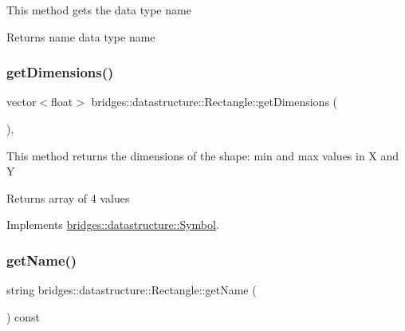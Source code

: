 This method gets the data type name

\begin{DoxyReturn}{Returns}
name data type name 
\end{DoxyReturn}
\mbox{\label{classbridges_1_1datastructure_1_1_rectangle_a2afae03e3ddd9bebaed1e573e04bdbf3}} 
\subsubsection{\texorpdfstring{get\+Dimensions()}{getDimensions()}}
{\footnotesize\ttfamily vector$<$float$>$ bridges\+::datastructure\+::\+Rectangle\+::get\+Dimensions (\begin{DoxyParamCaption}{ }\end{DoxyParamCaption})\hspace{0.3cm}{\ttfamily [inline]}, {\ttfamily [virtual]}}

This method returns the dimensions of the shape\+: min and max values in X and Y

\begin{DoxyReturn}{Returns}
array of 4 values 
\end{DoxyReturn}


Implements \mbox{\hyperlink{classbridges_1_1datastructure_1_1_symbol_a37ba60b6acdd0888677eb8c64a931679}{bridges\+::datastructure\+::\+Symbol}}.

\mbox{\label{classbridges_1_1datastructure_1_1_rectangle_aee4fa283fa95e8c3b9f8efd5b19427b8}} 
\subsubsection{\texorpdfstring{get\+Name()}{getName()}}
{\footnotesize\ttfamily string bridges\+::datastructure\+::\+Rectangle\+::get\+Name (\begin{DoxyParamCaption}{ }\end{DoxyParamCaption}) const\hspace{0.3cm}{\ttfamily [inline]}}

